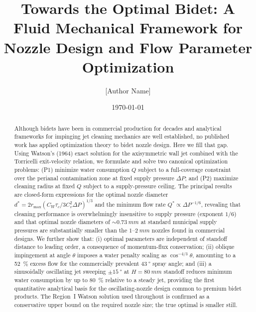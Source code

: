 \documentclass[aps,prfluids,reprint,amsmath,amssymb,floatfix]{revtex4-2}
\begin{document}
\title{Towards the Optimal Bidet: A Fluid Mechanical Framework
  for Nozzle Design and Flow Parameter Optimization}

\author{[Author Name]}

\date{\today}

\begin{abstract}
Although bidets have been in commercial production for decades and analytical
frameworks for impinging jet cleaning mechanics are well established, no
published work has applied optimization theory to bidet nozzle design.
Here we fill that gap. Using Watson's (1964) exact solution for the
axisymmetric wall jet combined with the Torricelli exit-velocity relation,
we formulate and solve two canonical optimization problems: (P1) minimize
water consumption $Q$ subject to a full-coverage constraint over the
perianal contamination zone at fixed supply pressure $\Delta P$; and (P2)
maximize cleaning radius at fixed $Q$ subject to a supply-pressure ceiling.
The principal results are closed-form expressions for the optimal nozzle
diameter $d^* = 2r_\mathrm{max}(C_W \tau_c / 3C_v^2 \Delta P)^{1/3}$
and the minimum flow rate $Q^* \propto \Delta P^{-1/6}$, revealing that
cleaning performance is overwhelmingly insensitive to supply pressure
(exponent $1/6$) and that optimal nozzle diameters of $\sim\SI{0.73}{mm}$
at standard municipal supply pressures are substantially smaller than the
$1$--$\SI{2}{mm}$ nozzles found in commercial designs.
We further show that: (i) optimal parameters are independent of standoff
distance to leading order, a consequence of momentum-flux conservation;
(ii) oblique impingement at angle $\theta$ imposes a water penalty scaling
as $\cos^{-4/3}\theta$, amounting to a \SI{52}{\percent} excess flow for
the commercially prevalent $\SI{43}{\degree}$ spray angle; and (iii) a
sinusoidally oscillating jet sweeping $\pm\SI{15}{\degree}$ at
$H = \SI{80}{mm}$ standoff reduces minimum water consumption by up to
\SI{80}{\percent} relative to a steady jet, providing the first
quantitative analytical basis for the oscillating-nozzle design common to
premium bidet products. The Region~I Watson solution used throughout is
confirmed as a conservative upper bound on the required nozzle size;
the true optimal is smaller still.
\end{abstract}

\maketitle
\end{document}

